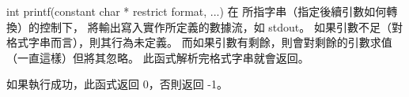 int printf(constant char * restrict format, ...) 
\stopbuffer
{}
在  所指字串（指定後續引數如何轉換）的控制下，
將輸出寫入實作所定義的數據流，如 stdout。
如果引數不足（對格式字串而言），則其行為未定義。
而如果引數有剩餘，則會對剩餘的引數求值（一直這樣）但將其忽略。
此函式解析完格式字串就會返回。

如果執行成功，此函式返回 0，否則返回 -1。
\stopbuffer

\startCLFD
{}
\stopCLFD
